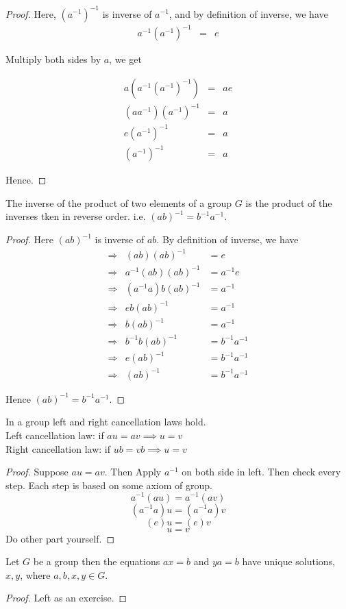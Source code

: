 \begin{proof}
Here, $(a^{-1})^{-1}$ is inverse of $a^{-1}$, and by definition
of inverse, we have 
\begin{eqnarray*}
a^{-1}(a^{-1})^{-1} & = & e
\end{eqnarray*}

Multiply both sides by $a$, we get

\begin{eqnarray*}
a(a^{-1}(a^{-1})^{-1}) & = & ae\\
(aa^{-1})(a^{-1})^{-1} & = & a\\
e(a^{-1})^{-1} & = & a\\
(a^{-1})^{-1} & = & a
\end{eqnarray*}

Hence.
\end{proof}
\begin{thm}
The inverse of the product of two elements of a group $G$ is the
product of the inverses tken in reverse order. i.e. $(ab)^{-1}=b^{-1}a^{-1}$.
\end{thm}
\begin{proof}
Here $(ab)^{-1}$ is inverse of $ab$. By definition of inverse, we
have 
\begin{eqnarray*}
\Rightarrow & (ab)(ab)^{-1} & =e\\
\Rightarrow & a^{-1}(ab)(ab)^{-1} & =a^{-1}e\\
\Rightarrow & (a^{-1}a)b(ab)^{-1} & =a^{-1}\\
\Rightarrow & eb(ab)^{-1} & =a^{-1}\\
\Rightarrow & b(ab)^{-1} & =a^{-1}\\
\Rightarrow & b^{-1}b(ab)^{-1} & =b^{-1}a^{-1}\\
\Rightarrow & e(ab)^{-1} & =b^{-1}a^{-1}\\
\Rightarrow & (ab)^{-1} & =b^{-1}a^{-1}
\end{eqnarray*}

Hence $(ab)^{-1}=b^{-1}a^{-1}$.
\end{proof}

\begin{thm}
	In a group left and right cancellation laws hold.\\
	Left cancellation law: if $au = av \implies u=v$\\
    Right cancellation law: if $ub = vb \implies u=v$
\end{thm}
\begin{proof}
	Suppose $au=av$. Then
	Apply $a^{-1}$ on both side in left. Then check every step. Each step is based on some axiom of group.
	\[a^{-1}(au) =a^{-1}(av)\]
		\[(a^{-1}a)u =(a^{-1}a)v\]
				\[(e)u =(e)v\]
								\[u =v\]
	Do other part yourself.
	\end{proof}
\begin{thm}
Let $G$ be a group then the equations $ax=b$ and $ya=b$
have unique solutions, $x,y$, where $a,b,x,y \in G$.
\end{thm}
\begin{proof}
	Left as an exercise.
	\end{proof}

